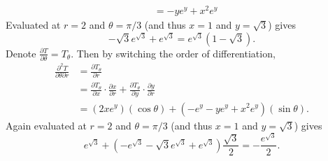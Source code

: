 \documentclass[12 pt]{article}
\begin{document}
\begin{enumerate}
\begin{align*}
			&= -ye^y + x^2e^{y}
		\end{align*}
		Evaluated at $r = 2$ and $\theta = \pi/3$ (and thus $x=1$ and $y=\sqrt3$) gives \[
			-\sqrt3e^{\sqrt3} + e^{\sqrt3} = e^{\sqrt3}(1- \sqrt3).
		\]
		Denote $\displaystyle \frac{\partial T}{\partial\theta} = T_\theta$. Then by
		switching the order of differentiation,
		\begin{align*}
			\frac{\partial^2 T}{\partial \theta \partial r}
			&= \frac{\partial T_\theta}{\partial r} \\
			&= \frac{\partial T_\theta}{\partial x}\cdot\frac{\partial x}{\partial r}
			+ \frac{\partial T_\theta}{\partial y}\cdot\frac{\partial y}{\partial r} \\
			&= (2xe^y)(\cos\theta) + (-e^y - ye^y + x^2e^y)(\sin\theta).
		\end{align*}
		Again evaluated at $r = 2$ and $\theta = \pi/3$
		(and thus $x=1$ and $y=\sqrt3$) gives \[
			e^{\sqrt3} + (-e^{\sqrt3} - \sqrt3e^{\sqrt3} + e^{\sqrt3})\frac{\sqrt3}2
			= -\frac{e^{\sqrt3}}2.
		\]
		\\
  \end{enumerate}
\end{document}
